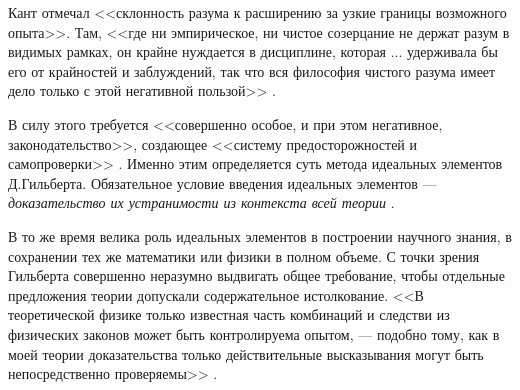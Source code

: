 \documentclass[a4page]{article}
\begin{document}
Кант отмечал <<склонность разума к расширению за узкие границы возможного опыта>>.
Там, <<где ни эмпирическое, ни чистое созерцание не держат разум в видимых рамках,
он крайне нуждается в дисциплине, которая ... удерживала бы его от крайностей и заблуждений,
так что вся философия чистого разума имеет дело только с этой негативной пользой>>
\cite{iphas-kant-pure-reason}.

В силу этого требуется <<совершенно особое, и при этом негативное, законодательство>>,
создающее <<систему предосторожностей и самопроверки>> \cite{iphas-kant-pure-reason}.
Именно этим определяется суть метода идеальных элементов Д.Гильберта.
Обязательное условие введения идеальных элементов ---
\textit{доказательство их устранимости из контекста всей теории} \cite{logic-and-philosophy}.

В то же время велика роль идеальных элементов в построении научного знания,
в сохранении тех же математики или физики в полном объеме.
С точки зрения Гильберта совершенно неразумно выдвигать общее требование,
чтобы отдельные предложения теории допускали содержательное истолкование.
<<В теоретической физике только известная часть комбинаций и следстви
из физических законов может быть контролируема опытом, --- подобно тому,
как в моей теории доказательства только действительные высказывания
могут быть непосредственно проверяемы>> \cite{the-foundations-of-geometry}.

\newpage
{}
\printbibliography
\end{document}
